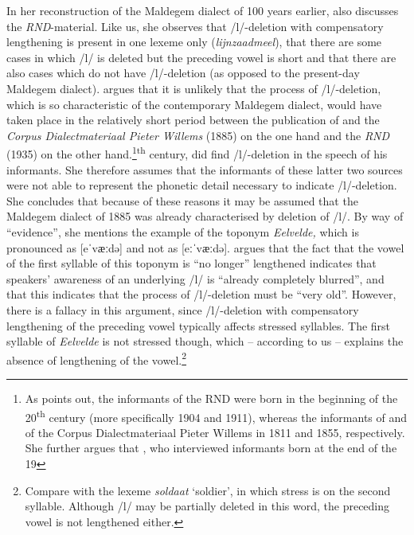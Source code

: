 \documentclass[output=paper,hidelinks,draftmode]{langscibook}
\begin{document}
In her reconstruction of the Maldegem dialect of 100 years earlier, \citet{Versieck1989} also discusses the \textit{RND}{}-material. Like us, she observes that /l/-deletion with compensatory lengthening is present in one lexeme only (\textit{lijnzaadmeel}), that there are some cases in which /l/ is deleted but the preceding vowel is short and that there are also cases which do not have /l/-deletion (as opposed to the present-day Maldegem dialect). \citet[176]{Versieck1989} argues that it is unlikely that the process of /l/-deletion, which is so characteristic of the contemporary Maldegem dialect, would have taken place in the relatively short period between the publication of \citet{Winkler1874} and the \textit{Corpus Dialectmateriaal Pieter Willems} (1885) on the one hand and the \textit{RND} (1935) on the other hand.\footnote{As \citet[176]{Versieck1989} points out, the informants of the RND were born in the beginning of the 20\textsuperscript{th} century (more specifically 1904 and 1911), whereas the informants of \citet{Winkler1874} and of the Corpus Dialectmateriaal Pieter Willems in 1811 and 1855, respectively. She further argues that \citet{Taeldeman1966}, who interviewed informants born at the end of the 19}{\textsuperscript{th}} {century, did find /l/-deletion in the speech of his informants.} She therefore assumes that the informants of these latter two sources were not able to represent the phonetic detail necessary to indicate /l/-deletion. She concludes that because of these reasons it may be assumed that the Maldegem dialect of 1885 was already characterised by deletion of /l/. By way of ``evidence'', she mentions the example of the toponym \textit{Eelvelde,} which is pronounced as [eˈv{ӕ}ːdə] and not as [eːˈv{ӕ}ːdə]. \citet[176]{Versieck1989} argues that the fact that the vowel of the first syllable of this toponym is “no longer” lengthened indicates that speakers’ awareness of an underlying /l/ is “already completely blurred”, and that this indicates that the process of /l/-deletion must be “very old”. However, there is a fallacy in this argument, since /l/-deletion with compensatory lengthening of the preceding vowel typically affects stressed syllables. The first syllable of \textit{Eelvelde} is not stressed though, which – according to us – explains the absence of lengthening of the vowel.\footnote{ {Compare with the lexeme} {\textit{soldaat} }{‘soldier’, in which stress is on the second syllable. Although /l/ may be partially deleted in this word, the preceding vowel is not lengthened either.}}
\end{document}
